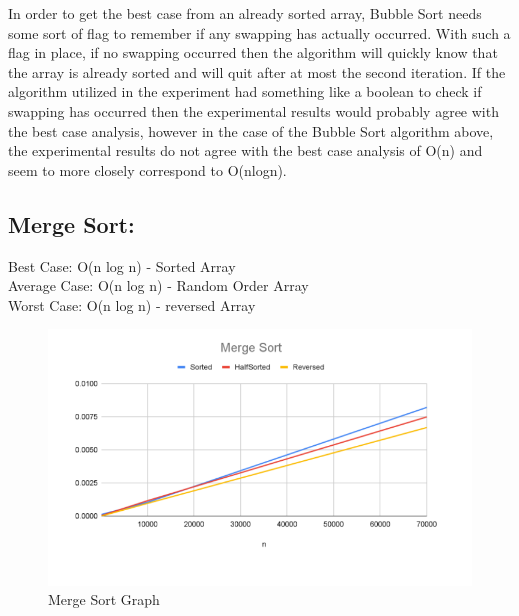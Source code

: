 \documentclass[12pt]{article}
\begin{document}
\indent	In order to get the best case from an already sorted array, Bubble Sort needs some sort of flag to remember if any swapping has actually occurred. With such a flag in place, if no swapping occurred then the algorithm will quickly know that the array is already sorted and will quit after at most the second iteration. If the algorithm utilized in the experiment had something like a boolean to check if swapping has occurred then the experimental results would probably agree with the best case analysis, however in the case of the Bubble Sort algorithm above, the experimental results do not agree with the best case analysis of O(n) and seem to more closely correspond to O(nlogn).\\

	\subsection{Merge Sort:}
	
	\indent\indent Best Case: O(n log n) - Sorted Array\\
	\indent Average Case: O(n log n) - Random Order Array\\
	\indent Worst Case: O(n log n) - reversed Array\\	

\begin{figure}[h]
	\centering
	\includegraphics[width=\textwidth]{Merge Sort.PNG}
\caption{Merge Sort Graph}
    \label{fig:mesh1}
\end{figure}
\end{document}
